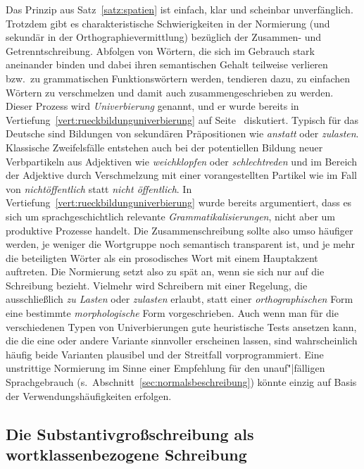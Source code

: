 Das Prinzip aus Satz~\ref{satz:spatien} ist einfach, klar und scheinbar unverfänglich.
Trotzdem gibt es charakteristische Schwierigkeiten in der Normierung (und sekundär in der Orthographievermittlung) bezüglich der Zusammen- und Getrenntschreibung.
Abfolgen von Wörtern, die sich im Gebrauch stark aneinander binden und dabei ihren semantischen Gehalt teilweise verlieren bzw.\ zu grammatischen Funktionswörtern werden, tendieren dazu, zu einfachen Wörtern zu verschmelzen und damit auch zusammengeschrieben zu werden.
Dieser Prozess wird \textit{Univerbierung} genannt, und er wurde bereits in Vertiefung~\ref{vert:rueckbildunguniverbierung} auf Seite~\pageref{vert:rueckbildunguniverbierung} diskutiert.
Typisch für das Deutsche sind \zB Bildungen von sekundären Präpositionen wie \textit{anstatt} oder \textit{zulasten}.
Klassische Zweifelsfälle entstehen auch bei der potentiellen Bildung neuer Verbpartikeln aus Adjektiven wie \textit{weichklopfen} oder \textit{schlechtreden} und im Bereich der Adjektive durch Verschmelzung mit einer vorangestellten Partikel wie im Fall von \textit{nichtöffentlich} statt \textit{nicht öffentlich}.
In Vertiefung~\ref{vert:rueckbildunguniverbierung} wurde bereits argumentiert, dass es sich um sprachgeschichtlich relevante \textit{Grammatikalisierungen}, nicht aber um produktive Prozesse handelt.
Die Zusammenschreibung sollte also umso häufiger werden, je weniger die Wortgruppe noch semantisch transparent ist, und je mehr die beteiligten Wörter als ein prosodisches Wort mit einem Hauptakzent auftreten.
Die Normierung setzt also zu spät an, wenn sie sich nur auf die Schreibung bezieht.
Vielmehr wird Schreibern mit einer Regelung, die \zB ausschließlich \textit{zu Lasten} oder \textit{zulasten} erlaubt, statt einer \textit{orthographischen} Form eine bestimmte \textit{morphologische} Form vorgeschrieben.
Auch wenn man für die verschiedenen Typen von Univerbierungen gute heuristische Tests ansetzen kann, die die eine oder andere Variante sinnvoller erscheinen lassen, sind wahrscheinlich häufig beide Varianten plausibel und der Streitfall vorprogrammiert.
Eine unstrittige Normierung im Sinne einer Empfehlung für den unauf"|fälligen Sprachgebrauch (s.\ Abschnitt~\ref{sec:normalsbeschreibung}) könnte einzig auf Basis der Verwendungshäufigkeiten erfolgen.

\subsection{Die Substantivgroßschreibung als wortklassenbezogene Schreibung}
\label{sec:diesubstantivgrossschreibungalswortklassenbezogeneschreibung}

